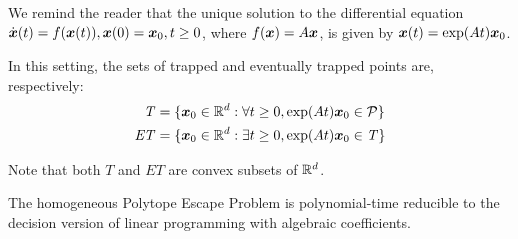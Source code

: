We remind the reader that the unique solution to the differential equation $\dot{\boldsymbol{x}}(t)=f(\boldsymbol{x}(t)),\boldsymbol{x}(0)=\boldsymbol{x}_{0},t\geq 0$, where $f(\boldsymbol{x})=A\boldsymbol{x}$, is given by
$\boldsymbol{x}(t)=\exp(At)\boldsymbol{x}_{0}$.

In this setting, the sets of trapped and eventually trapped points are, respectively:
\begin{align*}
\mathit{T}&=\lbrace \boldsymbol{x}_0\in\mathbb{R}^{d}: \forall t\geq 0, \exp(At)\boldsymbol{x}_{0} \in \mathcal{P}\rbrace \\
\mathit{ET}&=\lbrace\boldsymbol{x}_{0}\in\mathbb{R}^{d}:\exists t\geq 0,\exp(At)\boldsymbol{x}_{0}\in\mathit{T}\rbrace
\end{align*}

Note that both $\mathit{T}$ and $\mathit{ET}$ are convex subsets of $\mathbb{R}^d$.

\begin{lemma}
  The homogeneous Polytope Escape Problem is polynomial-time
  reducible to the decision version of linear programming with
  algebraic coefficients.
\end{lemma}

